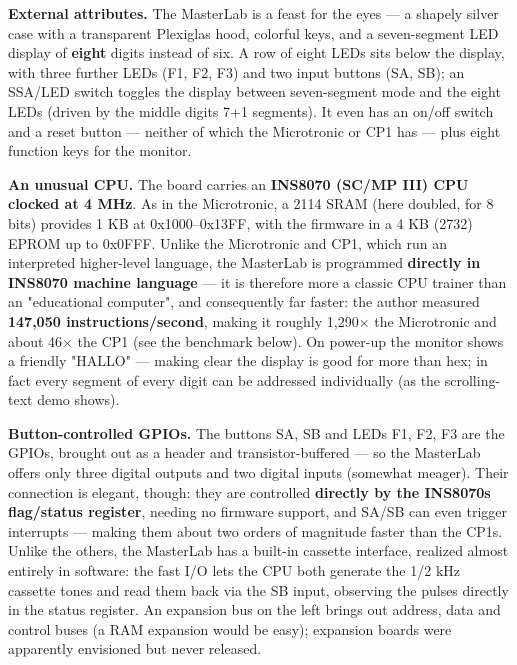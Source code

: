 \documentclass[
  11pt,
  letterpaper,
]{article}
\begin{document}
\textbf{External attributes.} The MasterLab is a feast for the eyes ---
a shapely silver case with a transparent Plexiglas hood, colorful keys,
and a seven-segment LED display of \textbf{eight} digits instead of six.
A row of eight LEDs sits below the display, with three further LEDs (F1,
F2, F3) and two input buttons (SA, SB); an SSA/LED switch toggles the
display between seven-segment mode and the eight LEDs (driven by the
middle digit\textquotesingle s 7+1 segments). It even has an on/off
switch and a reset button --- neither of which the Microtronic or CP1
has --- plus eight function keys for the monitor.

\textbf{An unusual CPU.} The board carries an \textbf{INS8070 (SC/MP
III) CPU clocked at 4 MHz}. As in the Microtronic, a 2114 SRAM (here
doubled, for 8 bits) provides 1 KB at 0x1000--0x13FF, with the firmware
in a 4 KB (2732) EPROM up to 0x0FFF. Unlike the Microtronic and CP1,
which run an interpreted higher-level language, the MasterLab is
programmed \textbf{directly in INS8070 machine language} --- it is
therefore more a classic CPU trainer than an "educational computer", and
consequently far faster: the author measured \textbf{147,050
instructions/second}, making it roughly 1,290× the Microtronic and about
46× the CP1 (see the benchmark below). On power-up the monitor shows a
friendly "HALLO" --- making clear the display is good for more than hex;
in fact every segment of every digit can be addressed individually (as
the scrolling-text demo shows).

\textbf{Button-controlled GPIOs.} The buttons SA, SB and LEDs F1, F2, F3
are the GPIOs, brought out as a header and transistor-buffered --- so
the MasterLab offers only three digital outputs and two digital inputs
(somewhat meager). Their connection is elegant, though: they are
controlled \textbf{directly by the INS8070\textquotesingle s flag/status
register}, needing no firmware support, and SA/SB can even trigger
interrupts --- making them about two orders of magnitude faster than the
CP1\textquotesingle s. Unlike the others, the MasterLab has a built-in
cassette interface, realized almost entirely in software: the fast I/O
lets the CPU both generate the 1/2 kHz cassette tones and read them back
via the SB input, observing the pulses directly in the status register.
An expansion bus on the left brings out address, data and control buses
(a RAM expansion would be easy); expansion boards were apparently
envisioned but never released.
\end{document}
